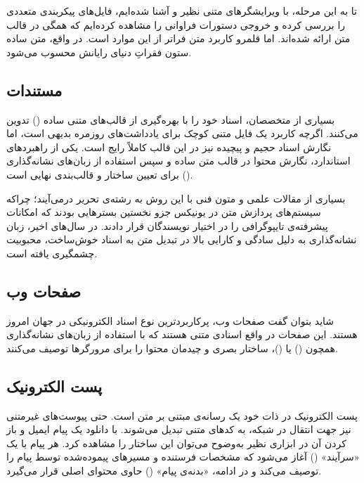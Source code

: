 تا به این مرحله، با ویرایشگرهای متنی نظیر  و  آشنا شده‌ایم، فایل‌های پیکربندی متعددی را بررسی کرده و خروجی دستورات فراوانی را مشاهده کرده‌ایم که همگی در قالب متن ارائه شده‌اند. اما قلمرو کاربرد متن فراتر از این موارد است. در واقع، متن ساده ستون فقراتِ دنیای رایانش محسوب می‌شود.

\subsection{مستندات}

بسیاری از متخصصان، اسناد خود را با بهره‌گیری از قالب‌های متنی ساده () تدوین می‌کنند. اگرچه کاربرد یک فایل متنی کوچک برای یادداشت‌های روزمره بدیهی است، اما نگارش اسناد حجیم و پیچیده نیز در این قالب کاملاً رایج است. یکی از راهبردهای استاندارد، نگارش محتوا در قالب متن ساده و سپس استفاده از زبان‌های نشانه‌گذاری () برای تعیین ساختار و قالب‌بندی نهایی است.

بسیاری از مقالات علمی و متون فنی با این روش به رشته‌ی تحریر درمی‌آیند؛ چراکه سیستم‌های پردازش متن در یونیکس جزو نخستین بسترهایی بودند که امکانات پیشرفته‌ی تایپوگرافی را در اختیار نویسندگان قرار دادند. در سال‌های اخیر، زبان نشانه‌گذاری  به دلیل سادگی و کارایی بالا در تبدیل متن به اسناد خوش‌ساخت، محبوبیت چشمگیری یافته است.

\subsection{صفحات وب}

شاید بتوان گفت صفحات وب، پرکاربردترین نوع اسناد الکترونیکی در جهان امروز هستند. این صفحات در واقع اسنادی متنی هستند که با استفاده از زبان‌های نشانه‌گذاری همچون  () یا  ()، ساختار بصری و چیدمان محتوا را برای مرورگرها توصیف می‌کنند.

\subsection{پست الکترونیک}

پست الکترونیک در ذات خود یک رسانه‌ی مبتنی بر متن است. حتی پیوست‌های غیرمتنی نیز جهت انتقال در شبکه، به کدهای متنی تبدیل می‌شوند. با دانلود یک پیام ایمیل و باز کردن آن در ابزاری نظیر  به‌وضوح می‌توان این ساختار را مشاهده کرد. هر پیام با یک «سرآیند» () آغاز می‌شود که مشخصات فرستنده و مسیرهای پیموده‌شده توسط پیام را توصیف می‌کند و در ادامه، «بدنه‌ی پیام» () حاوی محتوای اصلی قرار می‌گیرد.

